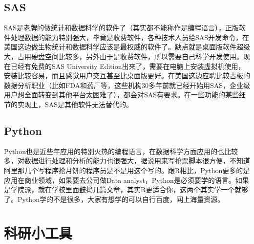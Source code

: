 \documentclass[11pt, a4paper]{article}
\begin{document}
\subsection{SAS}
SAS是老牌的做统计和数据科学的软件了（其实都不能称作是编程语言），正版软件处理数据的能力特别强大，毕竟是收费软件，各种技术人员给SAS开发命令，在美国这边做生物统计和数据科学应该是最权威的软件了。缺点就是桌面版软件超级大，占用硬盘空间比较多，另外由于是收费软件，所以需要自己科学开发使用。现在已经有免费的SAS University Edition出来了，需要在电脑上安装虚拟机使用，安装比较容易，而且感觉用户交互甚至比桌面版更好。在美国这边应聘比较古板的数据分析职业（比如FDA和药厂等，这些机构30多年前就已经开始用SAS，企业级用户想全面转变到其他平台太困难了），都会对SAS有要求。在一些功能的某些细节的实现上，SAS是其他软件无法替代的。

\subsection{Python}
Python也是近些年应用的特别火热的编程语言，在数据科学方面应用的也比较多，对数据进行处理和分析的能力也很强大，据说用来写抢票脚本很方便，不知道阿里那几个写程序抢月饼的程序员是不是用这个写的。跟R相比，Python更多的是应用在商业领域，如果要去公司做Data analyst，Python是必须要学的语言。如果是学院派，就在学校里面鼓捣几篇文章，其实R更适合你，这两个其实学一个就够了。Python学的不是很多，大家有想学的可以自行百度，网上海量资源。

\section{科研小工具}
\end{document}
